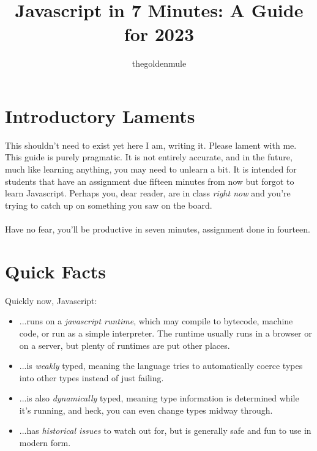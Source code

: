 \documentclass{article}
\title{Javascript in 7 Minutes: A Guide for 2023}
\author{thegoldenmule}
\begin{document}
\maketitle\tableofcontents



\newpage
\section{Introductory Laments}

This shouldn't need to exist yet here I am, writing it. Please lament with me. This guide is purely pragmatic. It is not entirely accurate, and in the future, much like learning anything, you may need to unlearn a bit. It is intended for students that have an assignment due fifteen minutes from now but forgot to learn Javascript. Perhaps you, dear reader, are in class \textit{right now} and you're trying to catch up on something you saw on the board.
\\
\\
Have no fear, you'll be productive in seven minutes, assignment done in fourteen.

\section{Quick Facts}

Quickly now, Javascript:\\

\begin{itemize}
	\item ...runs on a \textit{javascript runtime}, which may compile to bytecode, machine code, or run as a simple interpreter. The runtime usually runs in a browser or on a server, but plenty of runtimes are put other places.
	\item ...is \textit{weakly} typed, meaning the language tries to automatically coerce types into other types instead of just failing.
	\item ...is also \textit{dynamically} typed, meaning type information is determined while it's running, and heck, you can even change types midway through.
	\item ...has \textit{historical issues} to watch out for, but is generally safe and fun to use in modern form.
\end{itemize}
\end{document}
